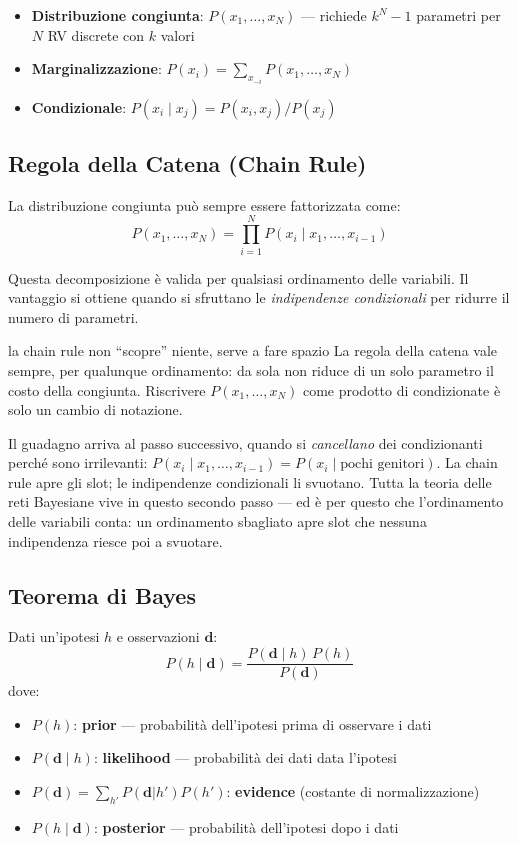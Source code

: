 \begin{itemize}
    \item \textbf{Distribuzione congiunta}: $P(x_1, \ldots, x_N)$ — richiede $k^N - 1$ parametri per $N$ RV discrete con $k$ valori
    \item \textbf{Marginalizzazione}: $P(x_i) = \sum_{x_{-i}} P(x_1, \ldots, x_N)$
    \item \textbf{Condizionale}: $P(x_i \mid x_j) = P(x_i, x_j) / P(x_j)$
\end{itemize}

\subsection{Regola della Catena (Chain Rule)}

La distribuzione congiunta può sempre essere fattorizzata come:
\[
P(x_1, \ldots, x_N) = \prod_{i=1}^{N} P(x_i \mid x_1, \ldots, x_{i-1})
\]

Questa decomposizione è valida per qualsiasi ordinamento delle variabili. Il vantaggio si ottiene quando si sfruttano le \emph{indipendenze condizionali} per ridurre il numero di parametri.

\begin{intuizione}{la chain rule non ``scopre'' niente, serve a fare spazio}
La regola della catena vale sempre, per qualunque ordinamento: da sola non riduce di un solo parametro il costo della congiunta. Riscrivere $P(x_1,\dots,x_N)$ come prodotto di condizionate è solo un cambio di notazione.

Il guadagno arriva al passo successivo, quando si \emph{cancellano} dei condizionanti perché sono irrilevanti: $P(x_i \mid x_1,\dots,x_{i-1}) = P(x_i \mid \text{pochi genitori})$. La chain rule apre gli slot; le indipendenze condizionali li svuotano. Tutta la teoria delle reti Bayesiane vive in questo secondo passo — ed è per questo che l'ordinamento delle variabili conta: un ordinamento sbagliato apre slot che nessuna indipendenza riesce poi a svuotare.
\end{intuizione}

\subsection{Teorema di Bayes}

Dati un'ipotesi $h$ e osservazioni $\mathbf{d}$:
\[
P(h \mid \mathbf{d}) = \frac{P(\mathbf{d} \mid h)\, P(h)}{P(\mathbf{d})}
\]
dove:
\begin{itemize}
    \item $P(h)$: \textbf{prior} — probabilità dell'ipotesi prima di osservare i dati
    \item $P(\mathbf{d} \mid h)$: \textbf{likelihood} — probabilità dei dati data l'ipotesi
    \item $P(\mathbf{d}) = \sum_{h'} P(\mathbf{d}|h')P(h')$: \textbf{evidence} (costante di normalizzazione)
    \item $P(h \mid \mathbf{d})$: \textbf{posterior} — probabilità dell'ipotesi dopo i dati
\end{itemize}

